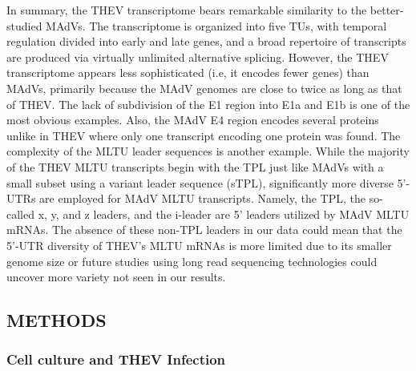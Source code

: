 \documentclass[
]{article}
\begin{document}
In summary, the THEV transcriptome bears remarkable similarity to the
better-studied MAdVs. The transcriptome is organized into five TUs, with
temporal regulation divided into early and late genes, and a broad
repertoire of transcripts are produced via virtually unlimited
alternative splicing. However, the THEV transcriptome appears less
sophisticated (i.e, it encodes fewer genes) than MAdVs, primarily
because the MAdV genomes are close to twice as long as that of THEV. The
lack of subdivision of the E1 region into E1a and E1b is one of the most
obvious examples. Also, the MAdV E4 region encodes several proteins
unlike in THEV where only one transcript encoding one protein was found.
The complexity of the MLTU leader sequences is another example. While
the majority of the THEV MLTU transcripts begin with the TPL just like
MAdVs with a small subset using a variant leader sequence (sTPL),
significantly more diverse 5'-UTRs are employed for MAdV MLTU
transcripts. Namely, the TPL, the so-called x, y, and z leaders, and the
i-leader are 5' leaders utilized by MAdV MLTU mRNAs. The absence of
these non-TPL leaders in our data could mean that the 5'-UTR diversity
of THEV's MLTU mRNAs is more limited due to its smaller genome size or
future studies using long read sequencing technologies could uncover
more variety not seen in our results. \newpage

\subsection{METHODS}\label{methods}

\subsubsection{Cell culture and THEV
Infection}\label{cell-culture-and-thev-infection}
\end{document}
